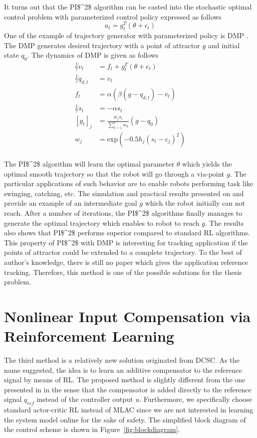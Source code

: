 It turns out that the \ac{PI$^2$} algorithm can be casted into the stochastic optimal control problem with parameterized control policy expressed as follows
\begin{equation}
a_t = g_t^T(\theta+\epsilon_t)
\end{equation}
One of the example of trajectory generator with parameterized policy is \ac {DMP} \cite{ijspeert2002learning}. The \ac{DMP} generates desired trajectory with a point of attractor $g$ and initial state $q_0$. The dynamics of \ac {DMP} is given as follows
\begin{align}
\frac{1}{\tau} \dot{v}_t &= f_t + g^T_t(\theta+\epsilon_t) \\
\frac{1}{\tau} \dot{q}_{d,t} &= v_t \\
f_t &= \alpha(\beta(g-q_{d,t})-v_t)\\
\frac{1}{\tau}\dot{s}_t &= -\alpha s_t\\
[g_t]_j &= \frac{w_js_t}{\sum_{k=1}^{p}w_k}(g-q_0)\\
w_j &= \text{exp}(-0.5h_j(s_t-c_j)^2)\\
\end{align}

The \ac{PI$^2$} algorithm will learn the optimal parameter $\theta$ which yields the optimal smooth trajectory so that the robot will go through a via-point $g$. The particular applications of such behavior are to enable robots performing task like swinging, catching, etc. The simulation and practical results presented on \cite{Buchli2010} and \cite{Buchli6037312} provide an example of an intermediate goal $g$ which the robot initially can not reach. After a number of iterations, the \ac{PI$^2$} algorithms finally manages to generate the optimal trajectory which enables to robot to reach $g$. The results also shows that \ac{PI$^2$} performs superior compared to standard \ac {RL} algorithms. This property of \ac{PI$^2$} with \ac {DMP} is interesting for tracking application if the points of attractor could be extended to a complete trajectory. To the best of author's knowledge, there is still no paper which gives the application reference tracking. Therefore, this method is one of the possible solutions for the thesis problem.

\section{Nonlinear Input Compensation via Reinforcement Learning} \label{sec:nl_comp}
The third method is a relatively new solution originated from \ac {DCSC}. As the name suggested, the idea is to learn an additive compensator to the reference signal by means of \ac{RL}. The proposed method is slightly different from the one presented in \cite{Efe2014} in the sense that the compensator is added directly to the reference signal $q_{ref}$ instead of the controller output $ u $. Furthermore, we specifically choose standard actor-critic \ac{RL} instead of \ac{MLAC} since we are not interested in learning the system model online for the sake of safety. The simplified block diagram of the control scheme is shown in Figure~\ref{fig:blockdiagram}. 

